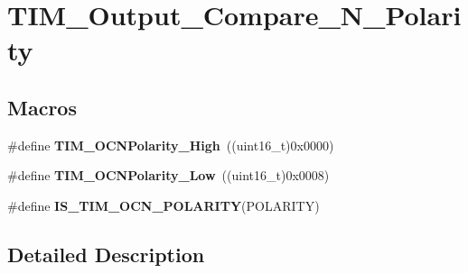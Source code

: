 \hypertarget{group___t_i_m___output___compare___n___polarity}{\section{T\-I\-M\-\_\-\-Output\-\_\-\-Compare\-\_\-\-N\-\_\-\-Polarity}
\label{group___t_i_m___output___compare___n___polarity}
}
\subsection*{Macros}
\begin{DoxyCompactItemize}
\item 
\hypertarget{group___t_i_m___output___compare___n___polarity_gaa62288888d4f6858bee6b3cd9086ae3f}{\#define {\bfseries T\-I\-M\-\_\-\-O\-C\-N\-Polarity\-\_\-\-High}~((uint16\-\_\-t)0x0000)}\label{group___t_i_m___output___compare___n___polarity_gaa62288888d4f6858bee6b3cd9086ae3f}

\item 
\hypertarget{group___t_i_m___output___compare___n___polarity_ga9582560b2e7dae2e8dc3b65909b0c9cf}{\#define {\bfseries T\-I\-M\-\_\-\-O\-C\-N\-Polarity\-\_\-\-Low}~((uint16\-\_\-t)0x0008)}\label{group___t_i_m___output___compare___n___polarity_ga9582560b2e7dae2e8dc3b65909b0c9cf}

\item 
\#define {\bfseries I\-S\-\_\-\-T\-I\-M\-\_\-\-O\-C\-N\-\_\-\-P\-O\-L\-A\-R\-I\-T\-Y}(P\-O\-L\-A\-R\-I\-T\-Y)
\end{DoxyCompactItemize}


\subsection{Detailed Description}


